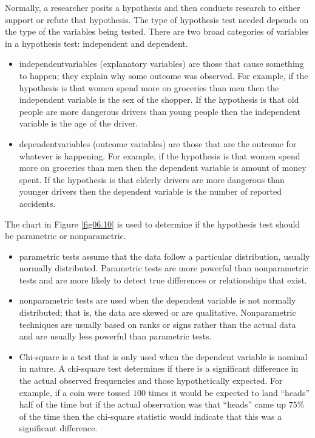 Normally, a researcher posits a hypothesis and then conducts research to either support or refute that hypothesis. The type of hypothesis test needed depends on the type of the variables being tested. There are two broad categories of variables in a hypothesis test: independent and dependent.

\begin{itemize}
	\item \Glspl{independentvariable} (explanatory variables) are those that cause something to happen; they explain why some outcome was observed. For example, if the hypothesis is that women spend more on groceries than men then the independent variable is the sex of the shopper. If the hypothesis is that old people are more dangerous drivers than young people then the independent variable is the age of the driver.
	\item \Glspl{dependentvariable} (outcome variables) are those that are the outcome for whatever is happening. For example, if the hypothesis is that women spend more on groceries than men then the dependent variable is amount of money spent. If the hypothesis is that elderly drivers are more dangerous than younger drivers then the dependent variable is the number of reported accidents.
\end{itemize}

The chart in Figure \ref{fig06.10} is used to determine if the hypothesis test should be parametric or nonparametric.

\begin{itemize}
	\item \Gls{parametric} tests assume that the data follow a particular distribution, usually normally distributed. Parametric tests are more powerful than nonparametric tests and are more likely to detect true differences or relationships that exist.
	\item \Gls{nonparametric} tests are used when the dependent variable is not normally distributed; that is, the data are skewed or are qualitative. Nonparametric techniques are usually based on ranks or signs rather than the actual data and are usually less powerful than parametric tests.
	\item Chi-square is a test that is only used when the dependent variable is nominal in nature. A chi-square test determines if there is a significant difference in the actual observed frequencies and those hypothetically expected. For example, if a coin were tossed $ 100 $ times it would be expected to land ``heads'' half of the time but if the actual observation was that ``heads'' came up $ 75\% $ of the time then the chi-square statistic would indicate that this was a significant difference.
\end{itemize}

